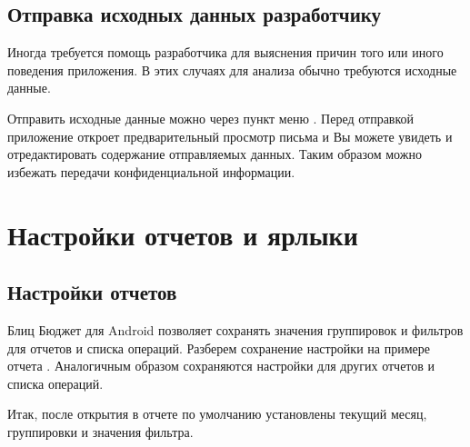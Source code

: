 \documentclass[a4paper,10pt,russian]{sphinxmanual}
\begin{document}
\section{Отправка исходных данных разработчику}
\label{\detokenize{bulk-actions:id8}}
\sphinxAtStartPar
Иногда требуется помощь разработчика для выяснения причин того или иного поведения приложения. В этих
случаях для анализа обычно требуются исходные данные.

\sphinxAtStartPar
Отправить исходные данные можно через пункт меню . Перед отправкой
приложение откроет предварительный просмотр письма и Вы можете увидеть и отредактировать содержание
отправляемых данных. Таким образом можно избежать передачи конфиденциальной информации.

\noindent{}

\noindent{}

\sphinxstepscope


\chapter{Настройки отчетов и ярлыки}
\label{\detokenize{shortcuts:chapter-shortcuts}}\label{\detokenize{shortcuts:id1}}\label{\detokenize{shortcuts::doc}}

\section{Настройки отчетов}
\label{\detokenize{shortcuts:id2}}
\sphinxAtStartPar
Блиц Бюджет для Android позволяет сохранять значения группировок и фильтров для отчетов и списка операций. Разберем
сохранение настройки на примере отчета . Аналогичным образом сохраняются настройки
для других отчетов и списка операций.

\sphinxAtStartPar
Итак, после открытия в отчете по умолчанию установлены текущий месяц, группировки и значения фильтра.

\noindent{}

\noindent{}

\noindent{}
\end{document}
